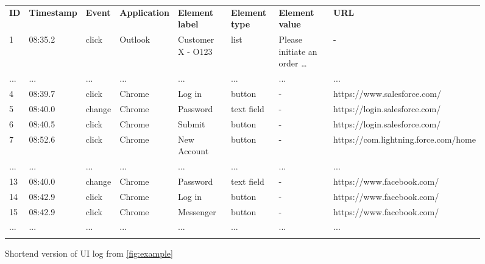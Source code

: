 \begin{figure}[h!]
\centering
 \begin{adjustbox}{max width=\textwidth}
\begin{tabular}{llllllll}
\hline\noalign{\smallskip}\noalign{\smallskip}
\textbf{ID} &\textbf{Timestamp}&\textbf{Event}&\textbf{Application}&\textbf{Element label}&\textbf{Element type}&\textbf{Element value}&\textbf{URL}\\
\noalign{\smallskip}\hline\noalign{\smallskip}
1&08:35.2&click&Outlook&Customer X - O123&list&Please initiate an order …&-\\\noalign{\smallskip}
...&...&...&...&...&...&...&...\\
4&08:39.7&click&Chrome&Log in&button&-&https://www.salesforce.com/\\\noalign{\smallskip}
5&08:40.0&change&Chrome&Password&text field&-&https://login.salesforce.com/\\\noalign{\smallskip}
6&08:40.5&click&Chrome&Submit&button&-&https://login.salesforce.com/\\\noalign{\smallskip}
7&08:52.6&click&Chrome&New Account&button&-&https://com.lightning.force.com/home\\\noalign{\smallskip}
...&...&...&...&...&...&...&...\\
13&08:40.0&change&Chrome&Password&text field&-&https://www.facebook.com/\\\noalign{\smallskip}
14&08:42.9&click&Chrome&Log in&button&-&https://www.facebook.com/\\\noalign{\smallskip}
15&08:42.9&click&Chrome&Messenger&button&-&https://www.facebook.com/\\\noalign{\smallskip}
...&...&...&...&...&...&...&...\\
\hline\noalign{\smallskip}
\end{tabular}
\end{adjustbox}
\caption{Shortend version of UI log from \autoref{fig:example}}
\label{fig:example_short}
\end{figure}

